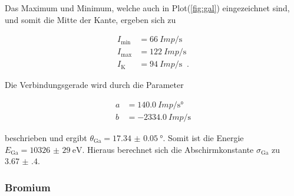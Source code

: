             \noindent Das Maximum und Minimum, welche auch in Plot(\ref{fig:gal}) eingezeichnet sind, und somit die Mitte der Kante, ergeben sich 
            zu

            \begin{align*}
                I_{\text{min}} &= \SI{66}{Imp\per\second}\\
                I_{\text{max}} &= \SI{122}{Imp\per\second}\\
                I_{\text{K}} &= \SI{94}{Imp\per\second} \; \; \text{.}
            \end{align*}

            \noindent Die Verbindungsgerade wird durch die Parameter 

            \begin{align*}
                a & = \SI{140.0}{Imp\per\second\degree}\\
                b & = \SI{-2334.0}{Imp\per\second}
            \end{align*}

            \noindent beschrieben und ergibt $\theta_{\text{Ga}} = \SI{17.34(5)}{\degree}$. Somit ist die Energie $E_{\text{Ga}} = \SI{10326(29)}{\electronvolt}$. 
            Hieraus berechnet sich die Abschirmkonstante $\sigma_{\text{Ga}}$ zu $ \num{3.67(40)}$.
      
    \subsubsection{Bromium}
            

